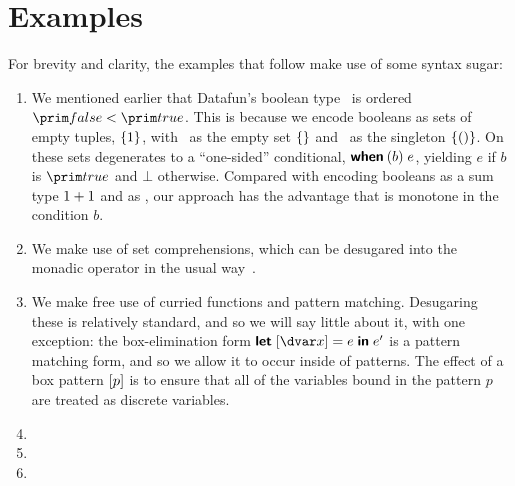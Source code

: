 \newcommand\notmember[2]{\neg \ebox{\mem \<\ebox{#1} \<{#2}}}
\renewcommand\notmember[2]{\ebox{#1} \not \in \ebox{#2}}

\section{Examples}
\label{examples}



For brevity and clarity, the examples that follow make use of some syntax sugar:

\begin{enumerate}

\item We mentioned earlier that Datafun's boolean type \tbool\ is ordered
  $\efalse < \etrue$. This is because we encode booleans as sets of empty
  tuples, $\{{1}\}$, with \efalse\ as the empty set $\{{}\}$ and
  \etrue\ as the singleton $\{{({})}\}$. On these sets 
  degenerates to a ``one-sided'' conditional, $\textsf{\bfseries when}\:({b})\; e$, yielding
  $e$ if $b$ is $\etrue$ and $\bot$ otherwise. Compared with encoding booleans
  as a sum type \(1 + 1\) and  as , our approach has
  the advantage that  is monotone in the condition $b$.


\item We make use of set comprehensions, which can be desugared into the monadic
  operator  in the usual way~\citep{wadler-monad-comprehensions}.

\item We make free use of curried functions and pattern matching. Desugaring
  these is relatively standard, and so we will say little about it, with one
  exception: the box-elimination form $\eletbox x e e'$ is a pattern matching
  form, and so we allow it to occur inside of patterns. The effect of a box
  pattern $[{p}]$ is to ensure that all of the variables bound in
  the pattern $p$ are treated as discrete variables.

\item {}

\item {}

\item {}
\end{enumerate}

